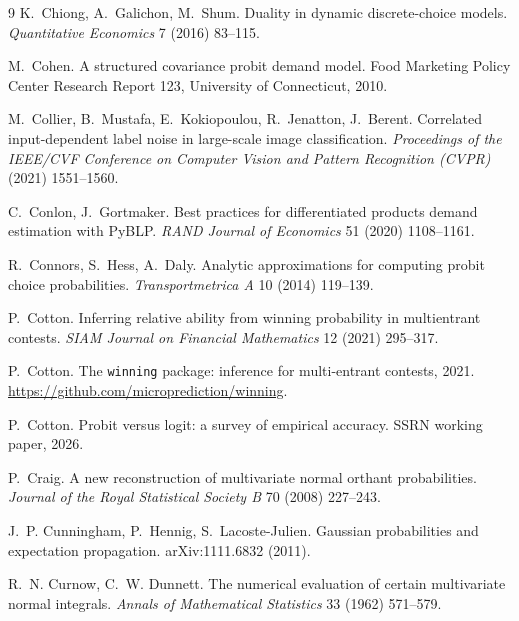 \documentclass[12pt]{article}
\theoremstyle{remark}
\begin{document}
\begin{thebibliography}{9}
 K.~Chiong, A.~Galichon, M.~Shum. Duality in dynamic
discrete-choice models. \emph{Quantitative Economics} 7 (2016) 83--115.

 M.~Cohen. A structured covariance
probit demand model. Food Marketing Policy Center Research Report 123,
University of Connecticut, 2010.

 M.~Collier, B.~Mustafa, E.~Kokiopoulou,
R.~Jenatton, J.~Berent. Correlated input-dependent label noise in
large-scale image classification. \emph{Proceedings of the IEEE/CVF Conference on Computer Vision and
Pattern Recognition (CVPR)} (2021)
1551--1560.

 C.~Conlon, J.~Gortmaker. Best practices for
differentiated products demand estimation with PyBLP. \emph{RAND Journal of
Economics} 51 (2020) 1108--1161.

 R.~Connors, S.~Hess, A.~Daly. Analytic approximations
for computing probit choice probabilities. \emph{Transportmetrica A} 10
(2014) 119--139.

 P.~Cotton. Inferring relative ability from winning
probability in multientrant contests. \emph{SIAM Journal on Financial Mathematics}
12 (2021) 295--317.

 P.~Cotton. The \texttt{winning} package: inference for multi-entrant contests,
2021. \url{https://github.com/microprediction/winning}.

 P.~Cotton. Probit versus logit:
a survey of empirical accuracy. SSRN working paper, 2026.

 P.~Craig. A new reconstruction of
multivariate normal orthant probabilities. \emph{Journal of the Royal
Statistical Society B} 70 (2008) 227--243.

 J.~P. Cunningham, P.~Hennig, S.~Lacoste-Julien.
Gaussian probabilities and expectation propagation. arXiv:1111.6832 (2011).

 R.~N. Curnow, C.~W.
Dunnett. The numerical evaluation of certain multivariate normal
integrals. \emph{Annals of Mathematical Statistics} 33 (1962) 571--579.


\end{thebibliography}
\end{document}
